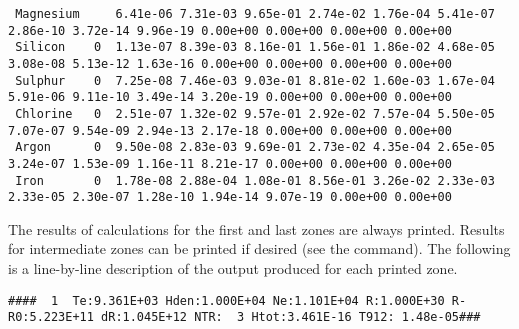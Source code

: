 {\begin{verbatim}
 Magnesium     6.41e-06 7.31e-03 9.65e-01 2.74e-02 1.76e-04 5.41e-07 2.86e-10 3.72e-14 9.96e-19 0.00e+00 0.00e+00 0.00e+00 0.00e+00
 Silicon    0  1.13e-07 8.39e-03 8.16e-01 1.56e-01 1.86e-02 4.68e-05 3.08e-08 5.13e-12 1.63e-16 0.00e+00 0.00e+00 0.00e+00 0.00e+00
 Sulphur    0  7.25e-08 7.46e-03 9.03e-01 8.81e-02 1.60e-03 1.67e-04 5.91e-06 9.11e-10 3.49e-14 3.20e-19 0.00e+00 0.00e+00 0.00e+00
 Chlorine   0  2.51e-07 1.32e-02 9.57e-01 2.92e-02 7.57e-04 5.50e-05 7.07e-07 9.54e-09 2.94e-13 2.17e-18 0.00e+00 0.00e+00 0.00e+00
 Argon      0  9.50e-08 2.83e-03 9.69e-01 2.73e-02 4.35e-04 2.65e-05 3.24e-07 1.53e-09 1.16e-11 8.21e-17 0.00e+00 0.00e+00 0.00e+00
 Iron       0  1.78e-08 2.88e-04 1.08e-01 8.56e-01 3.26e-02 2.33e-03 2.33e-05 2.30e-07 1.28e-10 1.94e-14 9.07e-19 0.00e+00 0.00e+00
\end{verbatim}
}

The results of calculations for the first and last zones are always
printed.
Results for intermediate zones can be printed if desired (see
the  command).
The following is a line-by-line description of
the output produced for each printed zone.
{\setverbatimfontsize{\tiny}
\begin{verbatim}
####  1  Te:9.361E+03 Hden:1.000E+04 Ne:1.101E+04 R:1.000E+30 R-R0:5.223E+11 dR:1.045E+12 NTR:  3 Htot:3.461E-16 T912: 1.48e-05###
\end{verbatim}
}

